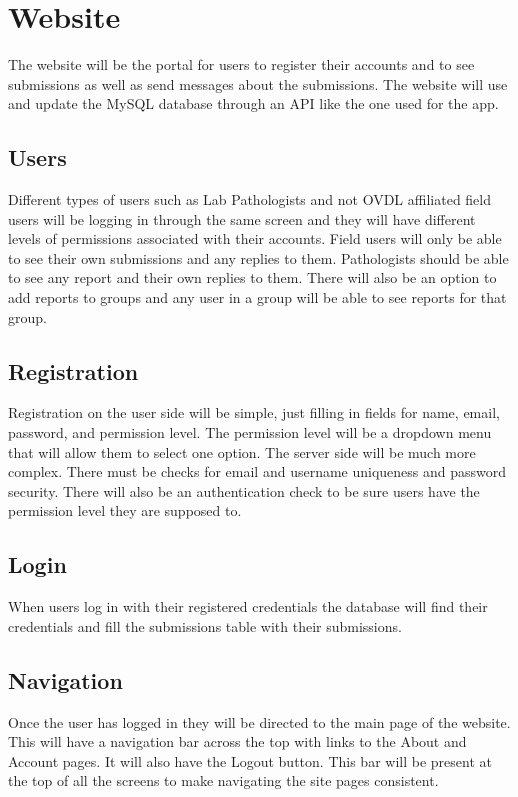 \documentclass[onecolumn, draftclsnofoot,10pt, compsoc]{IEEEtran}
\begin{document}
\section{Website}
The website will be the portal for users to register their accounts and to see submissions as well as send messages about the submissions. The website will use and update the MySQL database through an API like the one used for the app. 

\subsection{Users}
Different types of users such as Lab Pathologists and not OVDL affiliated field users will be logging in through the same screen and they will have different levels of permissions associated with their accounts. Field users will only be able to see their own submissions and any replies to them. Pathologists should be able to see any report and their own replies to them. There will also be an option to add reports to groups and any user in a group will be able to see reports for that group. 

\subsection{Registration}
Registration on the user side will be simple, just filling in fields for name, email, password, and permission level. The permission level will be a dropdown menu that will allow them to select one option. The server side will be much more complex. There must be checks for email and username uniqueness and password security. There will also be an authentication check to be sure users have the permission level they are supposed to. 

\subsection{Login}
When users log in with their registered credentials the database will find their credentials and fill the submissions table with their submissions. 

\subsection{Navigation}
Once the user has logged in they will be directed to the main page of the website. This will have a navigation bar across the top with links to the About and Account pages. It will also have the Logout button. This bar will be present at the top of all the screens to make navigating the site pages consistent. 
\end{document}
